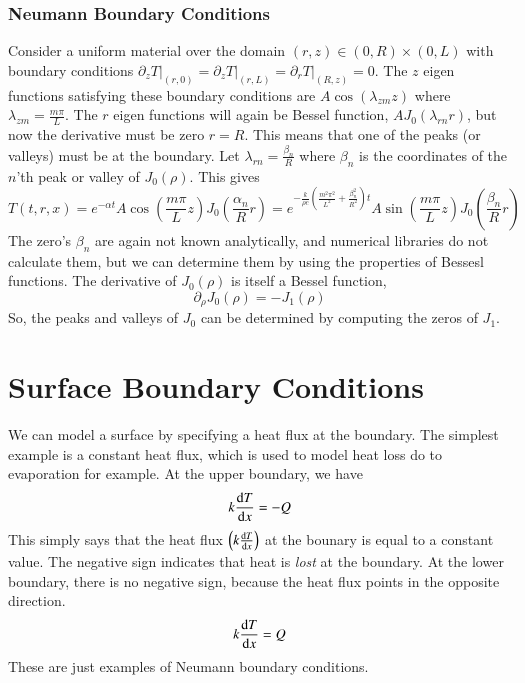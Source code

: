\documentclass[letterpaper,12pt]{article}
\begin{document}
\subsubsection{Neumann Boundary Conditions}
Consider a uniform material over the domain $(r,z) \in (0,R)\times(0,L)$ with boundary conditions
$\left.\partial_z T\right|_{(r,0)} = \left.\partial_z T\right|_{(r,L)} = \left.\partial_r T\right|_{(R,z)} = 0$.
The $z$ eigen functions satisfying these boundary conditions are
$A \cos(\lambda_{zm} z)$ where $\lambda_{zm} = \frac{m\pi}{L}$.
The $r$ eigen functions will again be Bessel function, $A J_0(\lambda_{rn} r)$, but now the derivative must
be zero $r = R$. This means that one of the peaks (or valleys) must be at the boundary. Let $\lambda_{rn} = \frac{\beta_n}{R}$ where
$\beta_n$ is the coordinates of the $n$'th peak or valley of $J_0(\rho)$. This gives
\begin{equation}
T(t,r,x) = e^{-\alpha t} A \cos\left(\frac{m\pi}{L} z\right) J_0\left(\frac{\alpha_n}{R} r\right) = 
e^{-\frac{k}{\rho c}\left( \frac{m^2\pi^2}{L^2} + \frac{\beta_n^2}{R^2}\right) t} A \sin\left(\frac{m\pi}{L} z\right) J_0\left(\frac{\beta_n}{R} r\right)
\end{equation}
The zero's $\beta_n$ are again not known analytically, and numerical libraries do not calculate them, but we can determine them by using
the properties of Bessesl functions. The derivative of $J_0(\rho)$ is itself a Bessel function,
\begin{equation}
  \partial_\rho J_0(\rho) = -J_1(\rho)
\end{equation}
So, the peaks and valleys of $J_0$ can be determined by computing the zeros of $J_1$.

\section{Surface Boundary Conditions}

We can model a surface by specifying a heat flux at the boundary. The simplest example is a constant heat flux, which is used to model heat loss do
to evaporation for example. At the upper boundary, we have
\begin{equation}
  k \dv{T}{x} = -Q
\end{equation}
This simply says that the heat flux $\qty(k \dv{T}{x})$ at the bounary is equal to a constant value. The negative sign indicates that heat is \emph{lost} at the boundary.
At the lower boundary, there is no negative sign, because the heat flux points in the opposite direction.
\begin{equation}
  k \dv{T}{x} = Q
\end{equation}
These are just examples of Neumann boundary conditions.
\end{document}
